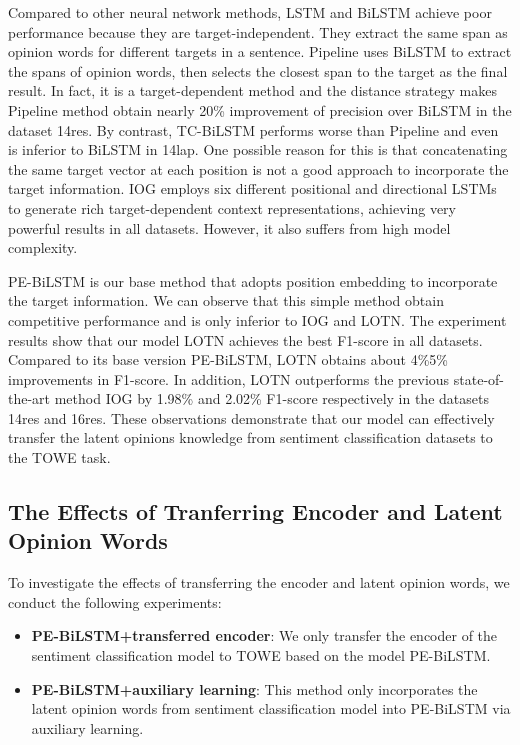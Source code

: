 \documentclass[letterpaper]{article} \usepackage{aaai20}  \usepackage{times}  \usepackage{helvet} \usepackage{courier}  \usepackage[hyphens]{url}  \usepackage{graphicx} \urlstyle{rm} \def\UrlFont{\rm}  \usepackage{graphicx}
\begin{document}
Compared to other neural network methods, LSTM and BiLSTM achieve poor performance because they are target-independent. They extract the same span as opinion words for different targets in a sentence. Pipeline uses BiLSTM to extract the spans of opinion words, then selects the closest span to the target as the final result. In fact, it is a target-dependent method and the distance strategy makes Pipeline method obtain nearly 20\% improvement of precision over BiLSTM in the dataset 14res. By contrast, TC-BiLSTM performs worse than Pipeline and even is inferior to BiLSTM in 14lap. One possible reason for this is that concatenating the same target vector at each position is not a good approach to incorporate the target information. IOG employs six different positional and directional LSTMs to generate rich target-dependent context representations, achieving very powerful results in all datasets. However, it also suffers from high model complexity.

PE-BiLSTM is our base method that adopts position embedding to incorporate the target information. We can observe that this simple method obtain competitive performance and is only inferior to IOG and LOTN. The experiment results show that our model LOTN achieves the best F1-score in all datasets. Compared to its base version PE-BiLSTM, LOTN obtains about 4\%5\% improvements in F1-score. In addition, LOTN outperforms the previous state-of-the-art method IOG by 1.98\% and 2.02\% F1-score respectively in the datasets 14res and 16res. These observations demonstrate that our model can effectively transfer the latent opinions knowledge from sentiment classification datasets to the TOWE task.

\subsection{The Effects of Tranferring Encoder and Latent Opinion Words}
To investigate the effects of transferring the encoder and latent opinion words, we conduct the following experiments:

\begin{itemize}
	\item \textbf{PE-BiLSTM+transferred encoder}: We only transfer the encoder of the sentiment classification model to TOWE based on the model PE-BiLSTM.
	\item  \textbf{PE-BiLSTM+auxiliary learning}: This method only incorporates the latent opinion words from sentiment classification model into PE-BiLSTM via auxiliary learning.
\end{itemize}
\end{document}
